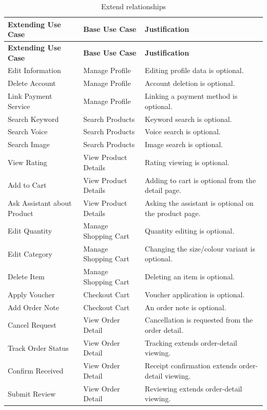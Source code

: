 \documentclass[11pt,a4paper,oneside]{extreport}
\newif\ifshowvtwo
\newcommand{\vtwocolor}{\ifshowvtwo\color{red}\fi}
\newcommand{\R}{\leavevmode\vtwocolor}   %
\begin{document}
{\begin{xltabular}{\textwidth}{@{}L{3.6cm} L{3.6cm} Y@{}}
\caption{Extend relationships}\label{tab:extend}\\
\toprule
\textbf{Extending Use Case} & \textbf{Base Use Case} & \textbf{Justification} \\ \midrule
\endfirsthead
\toprule
\textbf{Extending Use Case} & \textbf{Base Use Case} & \textbf{Justification} \\ \midrule
\endhead
\bottomrule
\endlastfoot
Edit Information & Manage Profile & Editing profile data is optional. \\
Delete Account & Manage Profile & Account deletion is optional. \\
Link Payment Service & Manage Profile & Linking a payment method is optional. \\
Search Keyword & Search Products & Keyword search is optional. \\
Search Voice & Search Products & Voice search is optional. \\
Search Image & Search Products & Image search is optional. \\
View Rating & View Product Details & Rating viewing is optional. \\
Add to Cart & View Product Details & Adding to cart is optional from the detail page. \\
\R Ask Assistant about Product & \R View Product Details & \R Asking the assistant is optional on the product page. \\
Edit Quantity & Manage Shopping Cart & Quantity editing is optional. \\
Edit Category & Manage Shopping Cart & Changing the size/colour variant is optional. \\
Delete Item & Manage Shopping Cart & Deleting an item is optional. \\
Apply Voucher & Checkout Cart & Voucher application is optional. \\
Add Order Note & Checkout Cart & An order note is optional. \\
Cancel Request & View Order Detail & Cancellation is requested from the order detail. \\
Track Order Status & View Order Detail & Tracking extends order-detail viewing. \\
Confirm Received & View Order Detail & Receipt confirmation extends order-detail viewing. \\
Submit Review & View Order Detail & Reviewing extends order-detail viewing. \\

\end{xltabular}}
\end{document}
